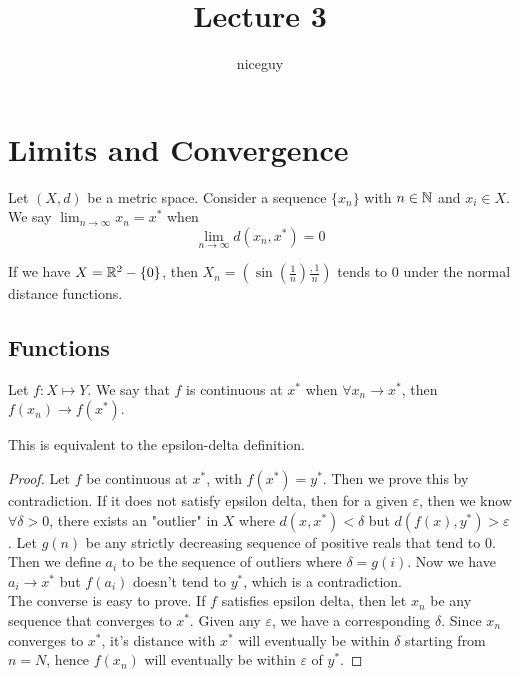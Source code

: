 \documentclass[12pt]{article}
\title{Lecture 3}
\author{niceguy}
\begin{document}
\maketitle

\section{Limits and Convergence}

Let $(X,d)$ be a metric space. Consider a sequence $\{x_n\}$ with $n \in \mathbb{N}$ and $x_i \in X$. We say $\lim_{n\rightarrow\infty} x_n = x^*$ when
$$\lim_{n\rightarrow\infty} d(x_n,x^*) = 0$$

\begin{ex}
    If we have $X = \mathbb{R}^2-\{0\}$, then $X_n = \left(\sin\left(\frac{1}{n}\right)\frac{,1}{n}\right)$ tends to $0$ under the normal distance functions.
\end{ex}

\subsection{Functions}

Let $f: X \mapsto Y$. We say that $f$ is continuous at $x^*$ when $\forall x_n \rightarrow x^*$, then $f(x_n) \rightarrow f(x^*)$.

\begin{prop}
    This is equivalent to the epsilon-delta definition.
\end{prop}

\begin{proof}
    Let $f$ be continuous at $x^*$, with $f(x^*) = y^*$. Then we prove this by contradiction. If it does not satisfy epsilon delta, then for a given $\varepsilon$, then we know $\forall \delta > 0$, there exists an "outlier" in $X$ where $d(x,x^*) < \delta$ but $d(f(x),y^*) > \varepsilon$. Let $g(n)$ be any strictly decreasing sequence of positive reals that tend to 0. Then we define $a_i$ to be the sequence of outliers where $\delta = g(i)$. Now we have $a_i \rightarrow x^*$ but $f(a_i)$ doesn't tend to $y^*$, which is a contradiction. \\
    The converse is easy to prove. If $f$ satisfies epsilon delta, then let $x_n$ be any sequence that converges to $x^*$. Given any $\varepsilon$, we have a corresponding $\delta$. Since $x_n$ converges to $x^*$, it's distance with $x^*$ will eventually be within $\delta$ starting from $n=N$, hence $f(x_n)$ will eventually be within $\varepsilon$ of $y^*$.
\end{proof}
\end{document}
